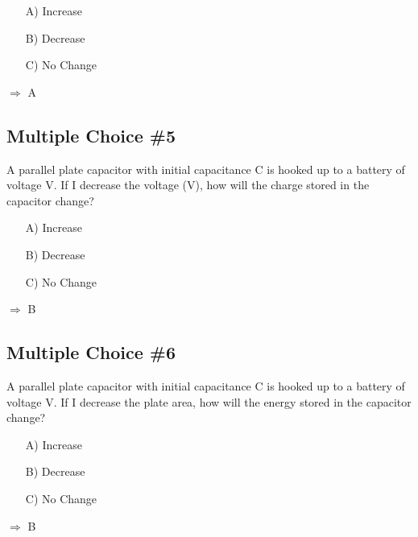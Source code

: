 \documentclass[11pt]{article}
\begin{document}
\begin{itemize}
\item[A)] Increase
\item[B)] Decrease
\item[C)] No Change
\end{itemize}
$\Rightarrow$ A

\pagebreak
\subsection{Multiple Choice \#5}
A parallel plate capacitor with initial capacitance C is hooked up to a battery of voltage V.  If I decrease the voltage (V), how will the charge stored in the capacitor change?

\begin{itemize}
\item[A)] Increase
\item[B)] Decrease
\item[C)] No Change
\end{itemize}
$\Rightarrow$ B

\subsection{Multiple Choice \#6}
A parallel plate capacitor with initial capacitance C is hooked up to a battery of voltage V.  If I decrease the plate area, how will the energy stored in the capacitor change?

\begin{itemize}
\item[A)] Increase
\item[B)] Decrease
\item[C)] No Change
\end{itemize}
$\Rightarrow$ B

\end{document}
